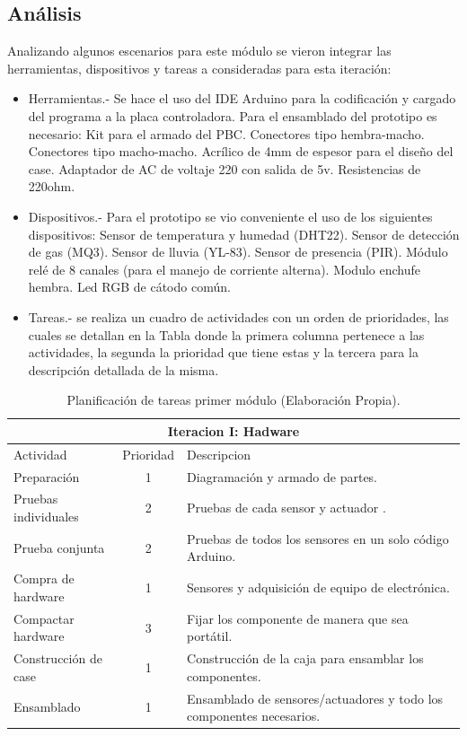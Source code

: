 \documentclass[11pt,letterpaper]{report}
\begin{document}
	\subsection{Análisis}
	Analizando algunos escenarios para este módulo se vieron integrar las herramientas, dispositivos y tareas a consideradas para esta iteración:
	\begin{itemize}
	\item Herramientas.-  Se hace el uso del  IDE Arduino para la codificación y cargado del programa a la placa controladora. Para el ensamblado del prototipo es necesario: 
	\subitem Kit para el armado del PBC.
 	\subitem Conectores tipo hembra-macho.
	\subitem Conectores tipo macho-macho.
	\subitem Acrílico de 4mm de espesor para el diseño del case.
	\subitem Adaptador de AC de voltaje 220 con salida de 5v.
	\subitem Resistencias de 220ohm.
	\item Dispositivos.- Para el prototipo se vio conveniente el uso de los siguientes dispositivos: 
	\subitem Sensor de temperatura y humedad (DHT22).
	\subitem Sensor de detección de gas (MQ3). 
	\subitem Sensor de lluvia (YL-83). 
	\subitem Sensor de presencia (PIR).
	\subitem Módulo relé de 8 canales (para el manejo de corriente alterna).
	\subitem Modulo enchufe hembra.
	\subitem Led RGB de cátodo común.
	\item Tareas.- se realiza un cuadro de actividades con un orden de prioridades, las cuales se detallan en la Tabla  donde la primera columna pertenece a las actividades, la segunda la prioridad que tiene  estas y la tercera para la descripción detallada de la misma.
	
	\end{itemize}
	\begin{table}[ht]
			\begin{center} %
				\begin{tabular} {||l | c | l||}
					\hline 
					\hline
					\multicolumn{3}{|c|}{Iteracion I: Hadware}\\
					\hline
					\hline 
					 Actividad & Prioridad & Descripcion \\   
					\hline
					\hline
					Preparación & 1 & Diagramación y armado de partes. \\  
					\hline
					Pruebas individuales & 2 &Pruebas de cada sensor y actuador . \\
					\hline
					Prueba conjunta & 2 & Pruebas de todos los sensores en un solo código Arduino. \\
					\hline
					Compra de hardware & 1 & Sensores y adquisición de equipo de electrónica.\\
					\hline
					Compactar hardware	& 3 & Fijar los componente de manera que sea portátil.\\
					\hline
					Construcción de case & 1 & Construcción de la caja para ensamblar los componentes.\\
					\hline
					Ensamblado & 1 & Ensamblado de sensores/actuadores  y todo los componentes necesarios.\\
					\hline
				\end{tabular}			
			\caption{Planificación de tareas primer módulo (Elaboración Propia).} 
			\label{tarea1}
			\end{center}
		\end{table}
\end{document}
